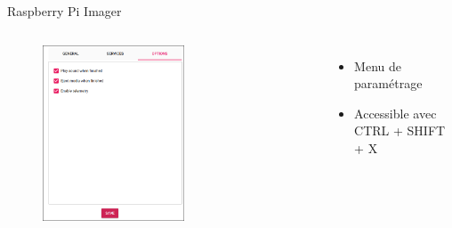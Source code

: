 \documentclass[aspectratio=169,xcolor=dvipsnames]{beamer}
\begin{document}
\begin{frame}{Raspberry Pi Imager}
    \begin{columns}[c] %

        \begin{figure}
            \includegraphics[width=0.6\textwidth]{images/rpi-imager-3.png}
        \end{figure}

        \begin{itemize}
            \item Menu de paramétrage
            \item Accessible avec CTRL + SHIFT + X
        \end{itemize}

    \end{columns}
\end{frame}

\end{document}
